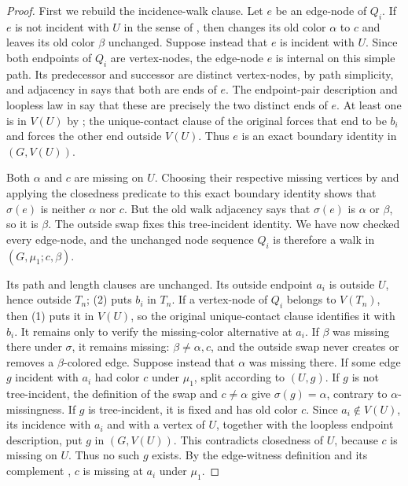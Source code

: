 \begin{proof}
First we rebuild the incidence-walk clause.  Let \(e\) be an edge-node
of \(Q_i\).  If \(e\) is not incident with \(U\) in the sense of
, then
 changes its old color \(\alpha\) to
\(c\) and leaves its old color \(\beta\) unchanged.  Suppose instead
that \(e\) is incident with \(U\).  Since both endpoints of \(Q_i\) are
vertex-nodes, the edge-node \(e\) is internal on this simple path.  Its
predecessor and successor are distinct vertex-nodes, by path simplicity,
and adjacency in  says that both are
ends of \(e\).  The endpoint-pair description and loopless law in
 say that these are precisely the two
distinct ends of \(e\).  At least one is in \(V(U)\) by
; the unique-contact clause of the original
 forces that end to be \(b_i\) and forces the other
end outside \(V(U)\).  Thus \(e\) is an exact boundary identity in
\((G,V(U))\).

Both \(\alpha\) and \(c\) are missing on \(U\).  Choosing their
respective missing vertices by  and applying
the closedness predicate  to this exact
boundary identity shows that \(\sigma(e)\) is neither \(\alpha\) nor
\(c\).  But the old walk adjacency says that \(\sigma(e)\) is
\(\alpha\) or \(\beta\), so it is \(\beta\).  The outside swap fixes
this tree-incident identity.  We have now checked every edge-node, and
the unchanged node sequence \(Q_i\) is therefore a walk in
\((G,\mu_1;c,\beta)\).

Its path and length clauses are unchanged.  Its outside endpoint \(a_i\)
is outside \(U\), hence outside \(T_n\); (2) puts \(b_i\) in \(T_n\).
If a vertex-node of \(Q_i\) belongs to \(V(T_n)\), then (1) puts it in
\(V(U)\), so the original unique-contact clause identifies it with
\(b_i\).  It remains only to verify the missing-color alternative at
\(a_i\).  If \(\beta\) was missing there under \(\sigma\), it remains
missing: \(\beta\ne\alpha,c\), and the outside swap never creates or
removes a \(\beta\)-colored edge.  Suppose instead that \(\alpha\) was
missing there.  If some edge \(g\) incident with \(a_i\) had color
\(c\) under \(\mu_1\), split according to
\((U,g)\).  If \(g\) is not tree-incident,
the definition of the swap and \(c\ne\alpha\) give
\(\sigma(g)=\alpha\), contrary to \(\alpha\)-missingness.  If \(g\)
is tree-incident, it is fixed and has old color \(c\).  Since
\(a_i\notin V(U)\), its incidence with \(a_i\) and with a vertex of
\(U\), together with the loopless endpoint description, put \(g\) in
\((G,V(U))\).  This contradicts closedness of
\(U\), because \(c\) is missing on \(U\).  Thus no such \(g\) exists.
By the edge-witness definition  and its complement
, \(c\) is missing at \(a_i\) under \(\mu_1\).


\end{proof}
